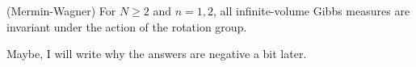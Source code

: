 
\begin{theorem}
(Mermin-Wagner) For $N \geq 2$ and $n=1,2$, all infinite-volume Gibbs measures are invariant under the action of the rotation group.
\end{theorem}

Maybe, I will write why the answers are negative a bit later. 

